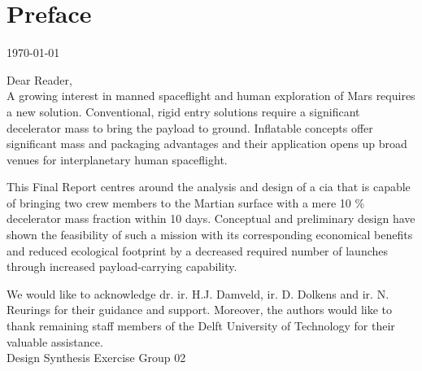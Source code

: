 \section*{Preface}\label{cha:preface}

\begin{flushright}
	\today
\end{flushright}

Dear Reader,	
\\ [1cm]
A growing interest in manned spaceflight and human exploration of Mars requires a new solution. Conventional, rigid entry solutions require a significant decelerator mass to bring the payload to ground. Inflatable concepts offer significant mass and packaging advantages and their application opens up broad venues for interplanetary human spaceflight. 

This Final Report centres around the analysis and design of a \acrlong{cia} that is capable of bringing two crew members to the Martian surface with a mere 10 \% decelerator mass fraction within 10 days. Conceptual and preliminary design have shown the feasibility of such a mission with its corresponding economical benefits and reduced ecological footprint by a decreased required number of launches through increased payload-carrying capability.

We would like to acknowledge dr. ir. H.J. Damveld, ir. D. Dolkens and ir. N. Reurings for their guidance and support. Moreover, the authors would like to thank remaining staff members of the Delft University of Technology for their valuable assistance.
\\ [1.5cm]
Design Synthesis Exercise Group 02
